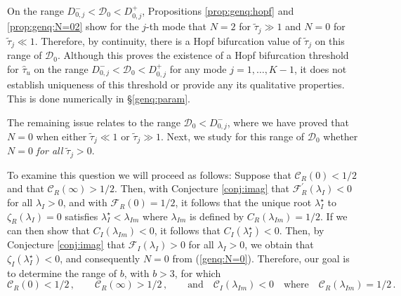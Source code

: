 \documentclass{article}%
\newcommand{\dzjp}{D^{+}_{0,j}}
\newcommand{\dzjm}{D^{-}_{0,j}}
\begin{document}
On the range $\dzjm<{\mathcal D}_0<\dzjp$, Propositions
\ref{prop:genq:hopf} and \ref{prop:genq:N=02} show for the $j$-th mode
that $N=2$ for $\tilde{\tau}_j\gg 1$ and $N=0$ for $\tilde{\tau}_j\ll
1 $. Therefore, by continuity, there is a Hopf bifurcation value of
$\tilde{\tau}_j$ on this range of ${\mathcal D}_0$. Although this
proves the existence of a Hopf bifurcation threshold for
$\hat{\tau}_u$ on the range $\dzjm<{\mathcal D}_0<\dzjp$ for any mode
$j=1,\ldots,K-1$, it does not establish uniqueness of this threshold 
or provide any its qualitative properties. This is done numerically in
\S \ref{genq:param}.

The remaining issue relates to the range ${\mathcal D}_0<\dzjm$, where
we have proved that $N=0$ when either $\tilde{\tau}_j\ll 1$ or
$\tilde{\tau}_j\gg 1$. Next, we study for this range of ${\mathcal
  D}_0$ whether $N=0$ {\em for all} $\tilde{\tau}_j>0$.

To examine this question we will proceed as follows: Suppose that
${\mathcal C}_R(0)<{1/2}$ and that ${\mathcal C}_{R}(\infty)>{1/2}$.
Then, with Conjecture \ref{conj:imag} that ${\mathcal
  F}_R^{\prime}(\lambda_I)<0$ for all $\lambda_I>0$, and with
${\mathcal F}_R(0)={1/2}$, it follows that the unique root
$\lambda_{I}^{\star}$ to $\zeta_R(\lambda_I)=0$ satisfies
$\lambda_{I}^{\star}<\lambda_{Im}$ where $\lambda_{Im}$ is defined by
$C_{R}(\lambda_{Im})={1/2}$. If we can then show that
$C_{I}(\lambda_{Im})<0$, it follows that
$C_{I}(\lambda_{I}^{\star})<0$. Then, by Conjecture \ref{conj:imag}
that ${\mathcal F}_I(\lambda_I)>0$ for all $\lambda_I>0$, we obtain
that $\zeta_I(\lambda_{I}^{\star})<0$, and consequently $N=0$ from
(\ref{genq:N=0}).  Therefore, our goal is to determine the range of
$b$, with $b>3$, for which
\begin{equation}\label{genq:bound}
      {\mathcal C}_{R}(0)<{1/2} \,, \qquad
{\mathcal C}_{R}(\infty)>{1/2} \,, \qquad \mbox{and} \quad
  {\mathcal C}_{I}(\lambda_{Im})<0  \quad \mbox{where} \quad
 {\mathcal C}_{R}(\lambda_{Im}) = {1/2} \,.
\end{equation}
\end{document}
